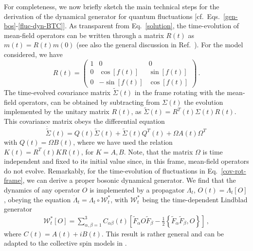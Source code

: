 \documentclass[prl,superscriptaddress,showpacs,longbibliography,reprint]{revtex4-2}
\begin{document}
For completeness, we now briefly sketch the main technical steps for the derivation of the dynamical generator for quantum fluctuations [cf.~Eqs.~\eqref{gen-bos}-\eqref{fluc-dyn-BTC}]. As transparent from Eq.~\eqref{solution}, the time-evolution of mean-field operators can be written through a matrix $R(t)$ as  $m(t)=R(t)m(0)$ (see also the general discussion in Ref.~\cite{benatti2018}). For the model considered, we have  
\begin{equation}
    R(t)=\begin{pmatrix}
    1&0&0\\
    0&\cos[f(t)]&\sin[f(t)]\\
    0&-\sin[f(t)]&\cos[f(t)]
    \end{pmatrix}\, .
    \label{R-matrix}
\end{equation}
The time-evolved covariance matrix $\tilde{\Sigma}(t)$ in the frame rotating with the mean-field operators, can be obtained by subtracting from ${\Sigma}(t)$ the evolution implemented by the unitary matrix $R(t)$, as $\tilde{\Sigma}(t)=R^T(t) \Sigma(t) R(t)$. This covariance matrix obeys the differential equation \cite{SM}
\begin{equation}
\dot{\tilde{\Sigma}}(t)=Q(t)\tilde{\Sigma}(t)+ \tilde{\Sigma}(t)Q^T(t)+\Omega A(t) \Omega^T\, 
    \label{cov-rot-frame}
\end{equation}
with $Q(t)=\Omega B(t)$, where we have used the relation $K(t)=R^{T}(t)KR(t)$, for $K=A,B$. Note, that the matrix $\Omega$ is time independent and fixed to its initial value since, in this frame, mean-field operators do not evolve. 
Remarkably, for the time-evolution of fluctuations in Eq.~\eqref{cov-rot-frame}, we can derive a proper bosonic dynamical generator. We find that the dynamics of any operator $O$ is implemented by a propagator $\Lambda_t$, $O(t)=\Lambda_t\left[O\right]$, obeying the equation  $\dot{\Lambda}_t=\Lambda_t\circ \mathcal{W}_t^*$, with  $\mathcal{W}_t^*$ being the time-dependent Lindblad generator 
\begin{equation}
\begin{split}
    \mathcal{W}^*_t[O]=\sum_{\alpha,\beta=1}^{3}C_{\alpha\beta}(t)\left[ \tilde{F}_\alpha O \tilde{F}_\beta -\frac{1}{2}\left\{\tilde{F}_\alpha \tilde{F}_\beta, O\right\}\right]\, ,
    \end{split}
    \label{gen-bos}
\end{equation}
where $C(t)=A(t)+iB(t)$. This result is rather general and can be adapted to the collective spin models in \cite{benatti2018}.
\end{document}
